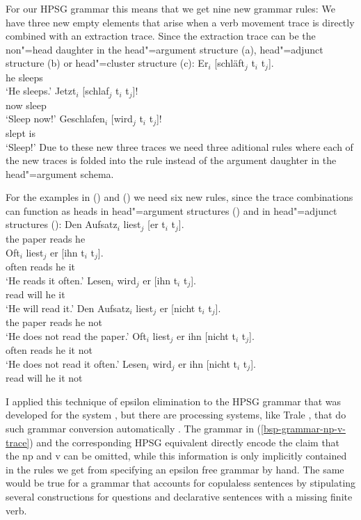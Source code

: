 For our HPSG grammar this means that we get nine new grammar rules: We have three new empty
elements that arise when a verb movement trace is directly combined with an extraction trace.
Since the extraction trace can be the non"=head daughter in the head"=argument structure (a),
head"=adjunct structure (b) or head"=cluster structure (c):
\eal
\ex 
\gll Er$_i$    [schläft$_j$ t$_i$ t$_j$].\\
     he        \spacebr{}sleeps\\
\glt `He sleeps.'
\ex 
\gll Jetzt$_i$ [schlaf$_j$ t$_i$ t$_j$]!\\
     now       \spacebr{}sleep\\
\glt `Sleep now!'
\ex 
\gll Geschlafen$_i$ [wird$_j$ t$_i$ t$_j$]!\\
     slept \spacebr{}is\\
\glt `Sleep!'
\zl
Due to these new three traces we need three aditional rules where each of the new traces is folded
into the rule instead of the argument daughter in the head"=argument schema.

For the examples in () and () we need six new rules, since the trace combinations
can function as heads in head"=argument structures () and in head"=adjunct structures ():
\eal
\ex 
\gll Den Aufsatz$_i$ liest$_j$ [er t$_i$ t$_j$].\\
     the paper       reads     \spacebr{}he\\
\ex 
\gll Oft$_i$ liest$_j$ er [ihn t$_i$ t$_j$].\\
     often reads he \spacebr{}it\\
\glt `He reads it often.'
\ex 
\gll Lesen$_i$ wird$_j$ er [ihn t$_i$ t$_j$].\\
     read      will     he \spacebr{}it\\
\glt `He will read it.'
\zl
\eal
\ex 
\gll Den Aufsatz$_i$ liest$_j$ er [nicht t$_i$ t$_j$].\\
     the paper       reads     he \spacebr{}not\\
\glt `He does not read the paper.'
\ex 
\gll Oft$_i$ liest$_j$ er ihn [nicht t$_i$ t$_j$].\\
     often   reads     he it \spacebr{}not\\
\glt `He does not read it often.'
\ex 
\gll Lesen$_i$ wird$_j$ er ihn [nicht t$_i$ t$_j$].\\
     read      will    he it  \spacebr{}not\\
\zl


I applied this technique of epsilon elimination to the HPSG grammar that
was developed for the \verbmobil system \citep{MK2000a}, 
but there are processing systems, like Trale \citep*{MPR2002a-u},
that do such grammar conversion automatically \citep{Penn99b}.
The grammar in (\ref{bsp-grammar-np-v-trace}) and the corresponding
HPSG equivalent directly encode the claim that the np and v can be omitted, while
this information is only implicitly contained in the rules we get from specifying an
epsilon free grammar by hand. 
The same would be true for a grammar that accounts for copulaless sentences by
stipulating several constructions for questions and declarative sentences with
a missing finite verb.

